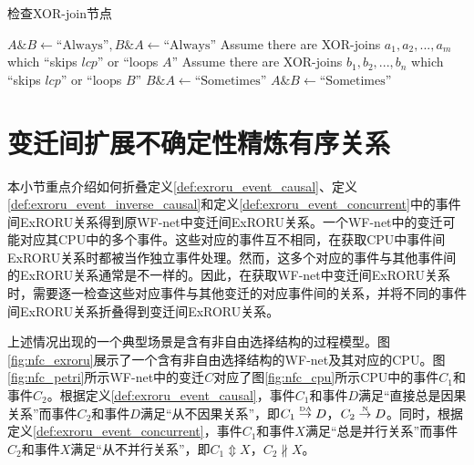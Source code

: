 \begin{algorithm}[htbp]
  \LinesNumbered
  \caption{检查XOR-join节点}
  \label{algo:exroru_event_concurrent_xorjoin}
   {
    \nl $A\&B\leftarrow\text{``Always''},B\&A\leftarrow\text{``Always''}$\;
    \nl Assume there are XOR-joins $a_{1},a_{2},...,a_{m}$ which ``skips $lcp$'' or ``loops $A$''\;
    \nl Assume there are XOR-joins $b_{1},b_{2},...,b_{n}$ which ``skips $lcp$'' or ``loops $B$''\;
    \nl {} {
      \nl {} {
        \nl {} {
  	      \nl {}
        } \nl {}
      }
    }
    \nl {} {
  	  \nl $B\&A\leftarrow\text{``Sometimes''}$\;
  	}
  	\nl {} {
  	  \nl $A\&B\leftarrow\text{``Sometimes''}$\;
  	}
  	\nl {}
  }
\end{algorithm}

\section{变迁间扩展不确定性精炼有序关系}\label{sec:exroru_transition}
本小节重点介绍如何折叠定义\ref{def:exroru_event_causal}、定义\ref{def:exroru_event_inverse_causal}和定义\ref{def:exroru_event_concurrent}中的事件间ExRORU关系得到原WF-net中变迁间ExRORU关系。一个WF-net中的变迁可能对应其CPU中的多个事件。这些对应的事件互不相同，在获取CPU中事件间ExRORU关系时都被当作独立事件处理。然而，这多个对应的事件与其他事件间的ExRORU关系通常是不一样的。因此，在获取WF-net中变迁间ExRORU关系时，需要逐一检查这些对应事件与其他变迁的对应事件间的关系，并将不同的事件间ExRORU关系折叠得到变迁间ExRORU关系。

上述情况出现的一个典型场景是含有非自由选择结构的过程模型。图\ref{fig:nfc_exroru}展示了一个含有非自由选择结构的WF-net及其对应的CPU。图\ref{fig:nfc_petri}所示WF-net中的变迁$C$对应了图\ref{fig:nfc_cpu}所示CPU中的事件$C_{1}$和事件$C_{2}$。根据定义\ref{def:exroru_event_causal}，事件$C_{1}$和事件$D$满足“直接总是因果关系”而事件$C_{2}$和事件$D$满足“从不因果关系”，即$C_{1}\overset{\text{\tiny{DA}}}{\rightarrow}D$，$C_{2}\overset{\text{\tiny{N}}}{\rightarrow}D$。同时，根据定义\ref{def:exroru_event_concurrent}，事件$C_{1}$和事件$X$满足“总是并行关系”而事件$C_{2}$和事件$X$满足“从不并行关系”，即$C_{1}\Updownarrow X$，$C_{2}\nparallel X$。

